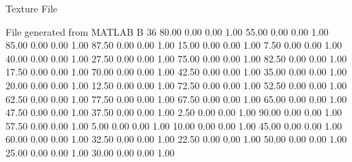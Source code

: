 Texture File

File generated from MATLAB
B 36
   80.00   0.00   0.00  1.00
   55.00   0.00   0.00  1.00
   85.00   0.00   0.00  1.00
   87.50   0.00   0.00  1.00
   15.00   0.00   0.00  1.00
    7.50   0.00   0.00  1.00
   40.00   0.00   0.00  1.00
   27.50   0.00   0.00  1.00
   75.00   0.00   0.00  1.00
   82.50   0.00   0.00  1.00
   17.50   0.00   0.00  1.00
   70.00   0.00   0.00  1.00
   42.50   0.00   0.00  1.00
   35.00   0.00   0.00  1.00
   20.00   0.00   0.00  1.00
   12.50   0.00   0.00  1.00
   72.50   0.00   0.00  1.00
   52.50   0.00   0.00  1.00
   62.50   0.00   0.00  1.00
   77.50   0.00   0.00  1.00
   67.50   0.00   0.00  1.00
   65.00   0.00   0.00  1.00
   47.50   0.00   0.00  1.00
   37.50   0.00   0.00  1.00
    2.50   0.00   0.00  1.00
   90.00   0.00   0.00  1.00
   57.50   0.00   0.00  1.00
    5.00   0.00   0.00  1.00
   10.00   0.00   0.00  1.00
   45.00   0.00   0.00  1.00
   60.00   0.00   0.00  1.00
   32.50   0.00   0.00  1.00
   22.50   0.00   0.00  1.00
   50.00   0.00   0.00  1.00
   25.00   0.00   0.00  1.00
   30.00   0.00   0.00  1.00
